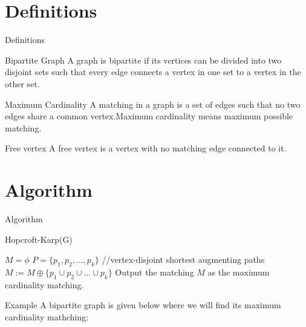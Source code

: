 \documentclass{beamer}
\begin{document}
\section{Definitions}
\begin{frame}{Definitions}
     \begin{block}{Bipartite Graph}
A graph is bipartite if its vertices can be divided into two disjoint sets such that every edge connects a vertex in one set to a vertex in the other set.
\end{block}
 \pause
\begin{block}{Maximum Cardinality}
A matching in a graph is a set of edges such that no two edges share a common vertex.Maximum cardinality means maximum possible matching.
\end{block} \pause
\begin{block}{Free vertex}
 A free vertex is a vertex with no matching edge connected to it.
\end{block}


\end{frame}

\section{Algorithm}
\begin{frame}{Algorithm}
\renewcommand{\thealgorithm}{}
\begin{algorithm}[H]
\caption{Hopcroft-Karp(G)}
\begin{algorithmic}[1]
\State $M=\phi$ \pause
{} \pause
\State $P=\{p_1,p_2,\dots,p_k\}$ {\small //vertex-disjoint shortest augmenting paths} \pause
\State $M:=M\oplus\{p_1 \cup p_2 \cup \dots \cup p_k\}$\pause
\EndWhile
\State Output the matching $M$ as the maximum cardinality matching.
\end{algorithmic}
\end{algorithm}
\end{frame}

\begin{frame}{Example}
A bipartite graph is given below where we will find its maximum cardinality mathching:\\
 \vspace{.5cm}
    \centering
{}
\end{frame}
\end{document}
